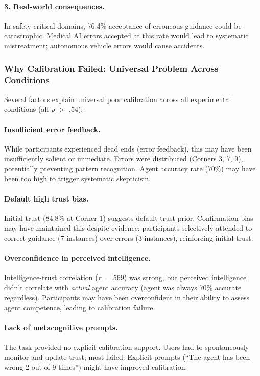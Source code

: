 \documentclass[12pt]{article}
\begin{document}
\paragraph{3. Real-world consequences.} In safety-critical domains, 76.4\% acceptance of erroneous guidance could be catastrophic. Medical AI errors accepted at this rate would lead to systematic mistreatment; autonomous vehicle errors would cause accidents.

\subsubsection{Why Calibration Failed: Universal Problem Across Conditions}

Several factors explain universal poor calibration across all experimental conditions (all \textit{p} $>$ .54):

\paragraph{Insufficient error feedback.} While participants experienced dead ends (error feedback), this may have been insufficiently salient or immediate. Errors were distributed (Corners 3, 7, 9), potentially preventing pattern recognition. Agent accuracy rate (70\%) may have been too high to trigger systematic skepticism.

\paragraph{Default high trust bias.} Initial trust (84.8\% at Corner 1) suggests default trust prior. Confirmation bias may have maintained this despite evidence: participants selectively attended to correct guidance (7 instances) over errors (3 instances), reinforcing initial trust.

\paragraph{Overconfidence in perceived intelligence.} Intelligence-trust correlation (\textit{r} = .569) was strong, but perceived intelligence didn't correlate with \textit{actual} agent accuracy (agent was always 70\% accurate regardless). Participants may have been overconfident in their ability to assess agent competence, leading to calibration failure.

\paragraph{Lack of metacognitive prompts.} The task provided no explicit calibration support. Users had to spontaneously monitor and update trust; most failed. Explicit prompts (``The agent has been wrong 2 out of 9 times'') might have improved calibration.
\end{document}
